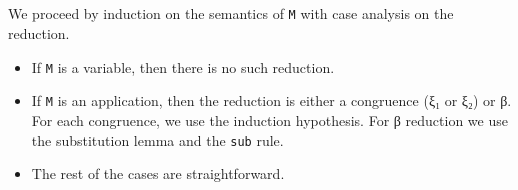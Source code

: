 \begin{fence}
\begin{code}
\AgdaSpace{}%
\AgdaSymbol{)}\AgdaSpace{}%
\AgdaSpace{}%
\AgdaSymbol{=}\AgdaSpace{}%
\AgdaSpace{}%
\AgdaSymbol{(}\AgdaSpace{}%
\AgdaSymbol{)}\AgdaSpace{}%
\<%
\\
\>[0]\AgdaSpace{}%
\AgdaSymbol{(}\AgdaSpace{}%
\AgdaSymbol{)}\AgdaSpace{}%
\AgdaSymbol{(}\AgdaSpace{}%
\AgdaSymbol{)}\AgdaSpace{}%
\AgdaSymbol{=}\AgdaSpace{}%
\AgdaSpace{}%
\AgdaSymbol{(}\AgdaSpace{}%
\AgdaSpace{}%
\AgdaSymbol{)}\<%
\\
\>[0]\AgdaSpace{}%
\AgdaSpace{}%
\AgdaSpace{}%
\AgdaSymbol{=}\AgdaSpace{}%
\<%
\\
\>[0]\AgdaSpace{}%
\AgdaSymbol{(}\AgdaSpace{}%
\AgdaSpace{}%
\AgdaSymbol{)}\AgdaSpace{}%
\AgdaSpace{}%
\AgdaSymbol{=}\AgdaSpace{}%
\AgdaSpace{}%
\AgdaSymbol{(}\AgdaSpace{}%
\AgdaSpace{}%
\AgdaSymbol{)}\AgdaSpace{}%
\AgdaSymbol{(}\AgdaSpace{}%
\AgdaSpace{}%
\AgdaSymbol{)}\<%
\\
\>[0]\AgdaSpace{}%
\AgdaSymbol{(}\AgdaSpace{}%
\AgdaSpace{}%
\AgdaSymbol{)}\AgdaSpace{}%
\AgdaSpace{}%
\AgdaSymbol{=}\AgdaSpace{}%
\AgdaSpace{}%
\AgdaSymbol{(}\AgdaSpace{}%
\AgdaSpace{}%
\AgdaSymbol{)}\AgdaSpace{}%
\<%
\end{code}
\end{fence}

We proceed by induction on the semantics of \texttt{M} with case
analysis on the reduction.

\begin{itemize}
\item
  If \texttt{M} is a variable, then there is no such reduction.
\item
  If \texttt{M} is an application, then the reduction is either a
  congruence (ξ₁ or ξ₂) or β. For each congruence, we use the induction
  hypothesis. For β reduction we use the substitution lemma and the
  \texttt{sub} rule.
\item
  The rest of the cases are straightforward.
\end{itemize}

